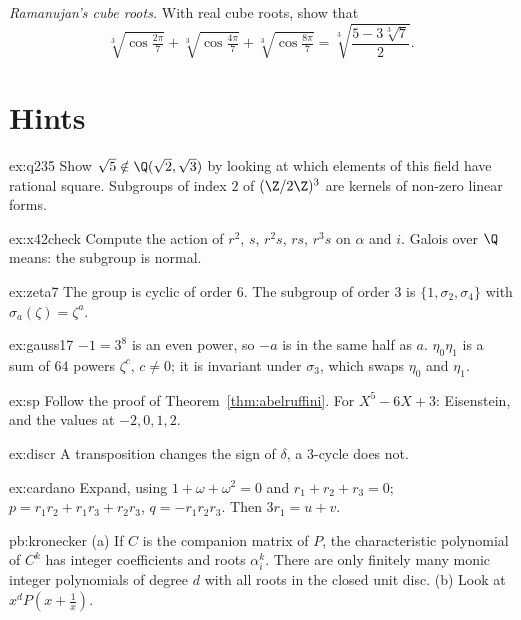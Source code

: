 \begin{exercise}[$\star\star\star$]\label{pb:ramacube}
\emph{Ramanujan's cube roots.} With real cube roots, show that
\[
\sqrt[3]{\cos\tfrac{2\pi}7}+\sqrt[3]{\cos\tfrac{4\pi}7}+\sqrt[3]{\cos\tfrac{8\pi}7}=\sqrt[3]{\frac{5-3\sqrt[3]7}2}.
\]
\end{exercise}

\section{Hints}

\begin{hint}{ex:q235}
Show $\sqrt5\notin\Q(\sqrt2,\sqrt3)$ by looking at which elements of this field have rational square. Subgroups of index $2$ of $(\Z/2\Z)^3$ are kernels of non-zero linear forms.
\end{hint}
\begin{hint}{ex:x42check}
Compute the action of $r^2$, $s$, $r^2s$, $rs$, $r^3s$ on $\alpha$ and $i$. Galois over $\Q$ means: the subgroup is normal.
\end{hint}
\begin{hint}{ex:zeta7}
The group is cyclic of order $6$. The subgroup of order $3$ is $\{1,\sigma_2,\sigma_4\}$ with $\sigma_a(\zeta)=\zeta^a$.
\end{hint}
\begin{hint}{ex:gauss17}
$-1=3^8$ is an even power, so $-a$ is in the same half as $a$. $\eta_0\eta_1$ is a sum of $64$ powers $\zeta^c$, $c\ne0$; it is invariant under $\sigma_3$, which swaps $\eta_0$ and $\eta_1$.
\end{hint}
\begin{hint}{ex:sp}
Follow the proof of Theorem~\ref{thm:abelruffini}. For $X^5-6X+3$: Eisenstein, and the values at $-2,0,1,2$.
\end{hint}
\begin{hint}{ex:discr}
A transposition changes the sign of $\delta$, a $3$-cycle does not.
\end{hint}
\begin{hint}{ex:cardano}
Expand, using $1+\omega+\omega^2=0$ and $r_1+r_2+r_3=0$; $p=r_1r_2+r_1r_3+r_2r_3$, $q=-r_1r_2r_3$. Then $3r_1=u+v$.
\end{hint}

\begin{hint}{pb:kronecker}
(a) If $C$ is the companion matrix of $P$, the characteristic polynomial of $C^k$ has integer coefficients and roots
$\alpha_i^k$. There are only finitely many monic integer polynomials of degree $d$ with all roots in the closed unit disc.
(b) Look at $x^dP(x+\frac1x)$.
\end{hint}


